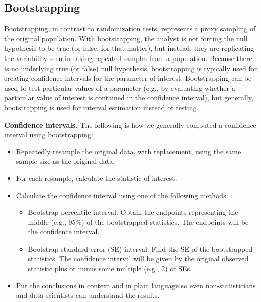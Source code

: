 \documentclass[
  10pt,
  openany]{book}
\begin{document}
\clearpage

\hypertarget{bootstrapping}{%
\subsection{Bootstrapping}\label{bootstrapping}}

Bootstrapping, in contrast to randomization tests, represents a proxy sampling of the original population.
With bootstrapping, the analyst is not forcing the null hypothesis to be true (or false, for that matter), but instead, they are replicating the variability seen in taking repeated samples from a population.
Because there is no underlying true (or false) null hypothesis, bootstrapping is typically used for creating confidence intervals for the parameter of interest.
Bootstrapping can be used to test particular values of a parameter (e.g., by evaluating whether a particular value of interest is contained in the confidence interval), but generally, bootstrapping is used for interval estimation instead of testing.

\textbf{Confidence intervals.} The following is how we generally computed a confidence interval using bootstrapping:

\begin{itemize}
\item
  Repeatedly resample the original data, with replacement, using the same sample size as the original data.
\item
  For each resample, calculate the statistic of interest.
\item
  Calculate the confidence interval using one of the following methods:

  \begin{itemize}
  \item
    Bootstrap percentile interval: Obtain the endpoints representing the middle (e.g., 95\%) of the bootstrapped statistics.
    The endpoints will be the confidence interval.
  \item
    Bootstrap standard error (SE) interval: Find the SE of the bootstrapped statistics.
    The confidence interval will be given by the original observed statistic plus or minus some multiple (e.g., 2) of SEs.
  \end{itemize}
\item
  Put the conclusions in context and in plain language so even non-statisticians and data scientists can understand the results.
\end{itemize}

\vspace{-4mm}
\end{document}
